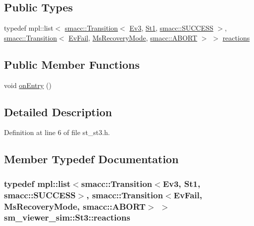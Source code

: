 \subsection*{Public Types}
\begin{DoxyCompactItemize}
\item 
typedef mpl\+::list$<$ \hyperlink{classsmacc_1_1Transition}{smacc\+::\+Transition}$<$ \hyperlink{structsm__viewer__sim_1_1Ev3}{Ev3}, \hyperlink{structsm__viewer__sim_1_1St1}{St1}, \hyperlink{structsmacc_1_1default__transition__tags_1_1SUCCESS}{smacc\+::\+S\+U\+C\+C\+E\+SS} $>$, \hyperlink{classsmacc_1_1Transition}{smacc\+::\+Transition}$<$ \hyperlink{structsm__viewer__sim_1_1EvFail}{Ev\+Fail}, \hyperlink{structsm__viewer__sim_1_1MsRecoveryMode}{Ms\+Recovery\+Mode}, \hyperlink{structsmacc_1_1default__transition__tags_1_1ABORT}{smacc\+::\+A\+B\+O\+RT} $>$ $>$ \hyperlink{structsm__viewer__sim_1_1St3_afecc48687572724774f674e9aa07c8b9}{reactions}
\end{DoxyCompactItemize}
\subsection*{Public Member Functions}
\begin{DoxyCompactItemize}
\item 
void \hyperlink{structsm__viewer__sim_1_1St3_a283ea2f506562090b95a40183c6b4f41}{on\+Entry} ()
\end{DoxyCompactItemize}


\subsection{Detailed Description}


Definition at line 6 of file st\+\_\+st3.\+h.



\subsection{Member Typedef Documentation}
\subsubsection[{\texorpdfstring{reactions}{reactions}}]{\setlength{\rightskip}{0pt plus 5cm}typedef mpl\+::list$<${\bf smacc\+::\+Transition}$<${\bf Ev3}, {\bf St1}, {\bf smacc\+::\+S\+U\+C\+C\+E\+SS}$>$, {\bf smacc\+::\+Transition}$<${\bf Ev\+Fail}, {\bf Ms\+Recovery\+Mode}, {\bf smacc\+::\+A\+B\+O\+RT}$>$ $>$ {\bf sm\+\_\+viewer\+\_\+sim\+::\+St3\+::reactions}}\hypertarget{structsm__viewer__sim_1_1St3_afecc48687572724774f674e9aa07c8b9}{}\label{structsm__viewer__sim_1_1St3_afecc48687572724774f674e9aa07c8b9}


